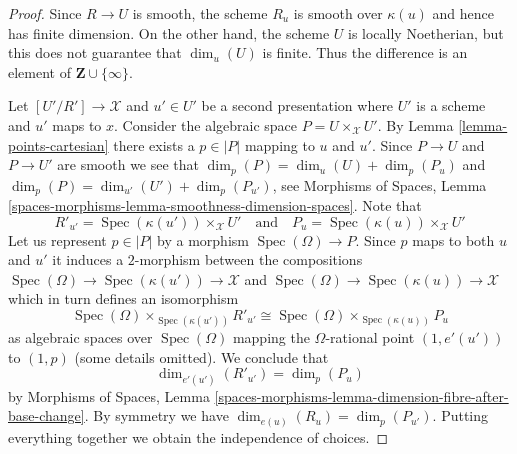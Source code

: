 \documentclass[10pt,a4paper]{amsart}
\theoremstyle{plain}
\theoremstyle{definition}
\theoremstyle{remark}
\numberwithin{equation}{subsection}
\def\Spec{\mathop{\mathrm{Spec}}}
\begin{document}
\begin{proof}
Since $R \to U$ is smooth, the scheme $R_u$ is smooth over $\kappa(u)$
and hence has finite dimension. On the other hand, the scheme $U$
is locally Noetherian, but this does not guarantee that
$\dim_u(U)$ is finite. Thus the difference is an element of
$\mathbf{Z} \cup \{\infty\}$.

\medskip\noindent
Let $[U'/R'] \to \mathcal{X}$ and $u' \in U'$ be a second presentation
where $U'$ is a scheme and $u'$ maps to $x$. Consider the algebraic
space $P = U \times_\mathcal{X} U'$. By
Lemma \ref{lemma-points-cartesian} there exists a $p \in |P|$ mapping to
$u$ and $u'$. Since $P \to U$ and $P \to U'$ are smooth we see that
$\dim_p(P) = \dim_u(U) + \dim_p(P_u)$ and
$\dim_p(P) = \dim_{u'}(U') + \dim_p(P_{u'})$, see
Morphisms of Spaces, Lemma
\ref{spaces-morphisms-lemma-smoothness-dimension-spaces}.
Note that
$$
R'_{u'} = \Spec(\kappa(u')) \times_\mathcal{X} U'
\quad\text{and}\quad
P_u = \Spec(\kappa(u)) \times_\mathcal{X} U'
$$
Let us represent $p \in |P|$ by a morphism $\Spec(\Omega) \to P$.
Since $p$ maps to both $u$ and $u'$ it induces a $2$-morphism
between the compositions
$\Spec(\Omega) \to \Spec(\kappa(u')) \to \mathcal{X}$ and
$\Spec(\Omega) \to \Spec(\kappa(u)) \to \mathcal{X}$
which in turn defines an isomorphism
$$
\Spec(\Omega) \times_{\Spec(\kappa(u'))} R'_{u'}
\cong
\Spec(\Omega) \times_{\Spec(\kappa(u))} P_u
$$
as algebraic spaces over $\Spec(\Omega)$ mapping the $\Omega$-rational
point $(1, e'(u'))$ to $(1, p)$ (some details omitted). We conclude that
$$
\dim_{e'(u')}(R'_{u'}) = \dim_p(P_u)
$$
by Morphisms of Spaces, Lemma
\ref{spaces-morphisms-lemma-dimension-fibre-after-base-change}.
By symmetry we have
$\dim_{e(u)}(R_u) = \dim_p(P_{u'})$.
Putting everything together we obtain the independence of choices.
\end{proof}
\end{document}
